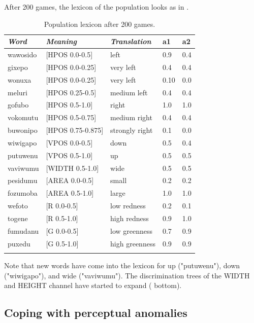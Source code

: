 After 200 games, the lexicon of the population looks as in . 
\begin{table}
\begin{center}
\begin{tabular}{ l  l  l  l  l }
\lsptoprule
{\itshape Word}&{\itshape Meaning}&{\itshape Translation} & {\bfshape a1}&{\bfshape a2} \\ \midrule
wawosido & [HPOS 0.0-0.5] &left&0.9&0.4\\ 
gixepo & [HPOS 0.0-0.25] & very left&0.4&0.4\\ 
wonuxa & [HPOS 0.0-0.25] & very left&0.10&0.0\\ 
meluri & [HPOS 0.25-0.5] &medium left&0.4&0.4\\ 
gofubo & [HPOS 0.5-1.0]& right&1.0&1.0\\ 
vokomutu & [HPOS 0.5-0.75] &medium right&0.4&0.4\\ 
buwonipo & [HPOS 0.75-0.875] &strongly right&0.1&0.0\\ 
wiwigapo & [VPOS 0.0-0.5] &down&0.5&0.4\\ 
putuwenu & [VPOS 0.5-1.0]&up & 0.5&0.5\\ 
vaviwumu & [WIDTH 0.5-1.0]&wide & 0.5&0.5\\ 
pesidumu & [AREA 0.0-0.5]&small& 0.2&0.2\\ 
fozumoba & [AREA 0.5-1.0]&large & 1.0&1.0\\ 
wefoto & [R 0.0-0.5]& low redness &0.2&0.1\\ 
togene & [R 0.5-1.0]& high redness &0.9&1.0\\ 
fumudanu & [G 0.0-0.5]& low greenness &0.7&0.9\\ 
puxedu & [G 0.5-1.0]& high greenness &0.9&0.9\\ 
\lspbottomrule
\end{tabular}
\caption{ \label{tab:upper} Population lexicon after 200 games.}
\end{center}
\end{table}
Note that new words have come into the lexicon 
for up ("putuwenu"), down ("wiwigapo"), and 
wide ("vaviwumu"). The discrimination trees of 
the WIDTH and HEIGHT channel have started to 
expand ( bottom). 

\subsection{Coping with perceptual anomalies}

